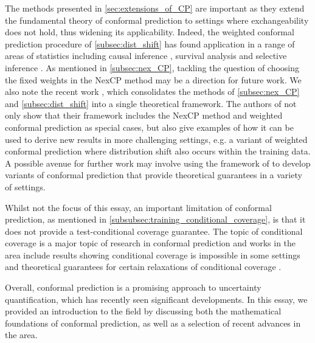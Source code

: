 \documentclass[11pt, titlepage]{article} %
\numberwithin{equation}{section}
\theoremstyle{definition}
\numberwithin{theorem}{section}
\numberwithin{lemma}{section}
\numberwithin{corollary}{section}
\numberwithin{proposition}{section}
\numberwithin{definition}{section}
\numberwithin{remark}{section}
\begin{document}
\noindent
The methods presented in \cref{sec:extensions_of_CP} are important as they extend the fundamental theory of conformal prediction to settings where exchangeability does not hold, thus widening its applicability. Indeed, the weighted conformal prediction procedure of \cref{subsec:dist_shift} has found application in a range of areas of statistics including causal inference \cite{lei2021conformal, jin2023sensitivity}, survival analysis \cite{candes2023survivalanalysis} and selective inference \cite{jin2023model}. As mentioned in \cref{subsec:nex_CP}, tackling the question of choosing the fixed weights in the NexCP method may be a direction for future work. We also note the recent work \cite{barber2025unifyingtheories}, which consolidates the methods of \cref{subsec:nex_CP} and \cref{subsec:dist_shift} into a single theoretical framework. The authors of \cite{barber2025unifyingtheories} not only show that their framework includes the NexCP method and weighted conformal prediction as special cases, but also give examples of how it can be used to derive new results in more challenging settings, e.g. a variant of weighted conformal prediction where distribution shift also occurs within the training data. A possible avenue for further work may involve using the framework of \cite{barber2025unifyingtheories} to develop variants of conformal prediction that provide theoretical guarantees in a variety of settings. \vskip5pt

\noindent
Whilst not the focus of this essay, an important limitation of conformal prediction, as mentioned in \cref{subsubsec:training_conditional_coverage}, is that it does not provide a test-conditional coverage guarantee. The topic of conditional coverage is a major topic of research in conformal prediction and works in the area include results showing conditional coverage is impossible in some settings \cite{lei2014distribution} and theoretical guarantees for certain relaxations of conditional coverage \cite{gibbs2025conformal}. \vskip5pt

\noindent
Overall, conformal prediction is a promising approach to uncertainty quantification, which has recently seen significant developments. In this essay, we provided an introduction to the field by discussing both the mathematical foundations of conformal prediction, as well as a selection of recent advances in the area.


%                                                                             
%                                                                             
\end{document}
